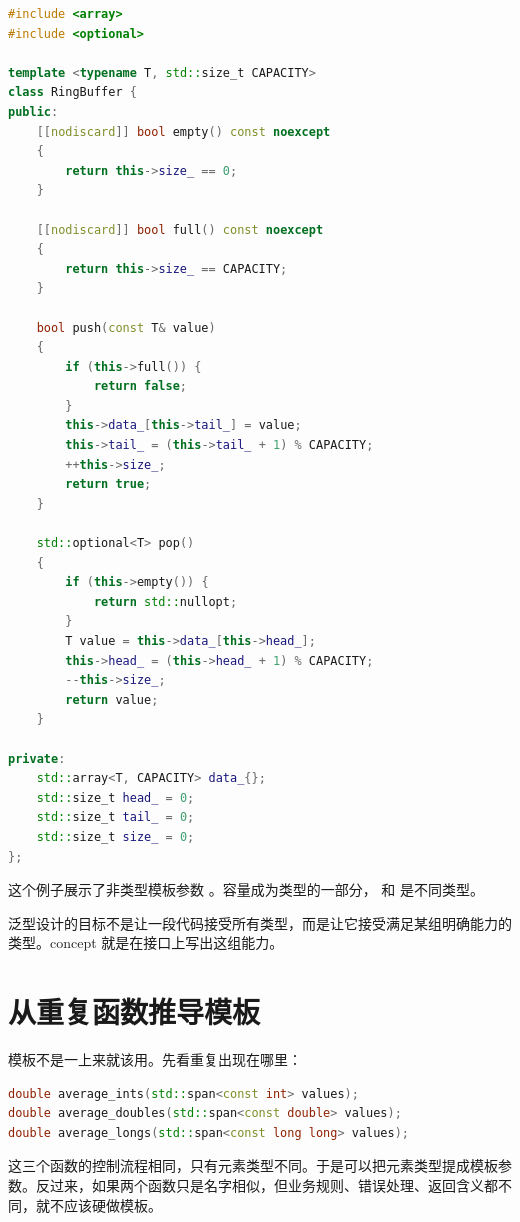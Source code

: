 \begin{lstlisting}[language=C++,caption={简单固定容量缓冲区}]
#include <array>
#include <optional>

template <typename T, std::size_t CAPACITY>
class RingBuffer {
public:
    [[nodiscard]] bool empty() const noexcept
    {
        return this->size_ == 0;
    }

    [[nodiscard]] bool full() const noexcept
    {
        return this->size_ == CAPACITY;
    }

    bool push(const T& value)
    {
        if (this->full()) {
            return false;
        }
        this->data_[this->tail_] = value;
        this->tail_ = (this->tail_ + 1) % CAPACITY;
        ++this->size_;
        return true;
    }

    std::optional<T> pop()
    {
        if (this->empty()) {
            return std::nullopt;
        }
        T value = this->data_[this->head_];
        this->head_ = (this->head_ + 1) % CAPACITY;
        --this->size_;
        return value;
    }

private:
    std::array<T, CAPACITY> data_{};
    std::size_t head_ = 0;
    std::size_t tail_ = 0;
    std::size_t size_ = 0;
};
\end{lstlisting}

这个例子展示了非类型模板参数 。容量成为类型的一部分， 和  是不同类型。

\begin{keyidea}
泛型设计的目标不是让一段代码接受所有类型，而是让它接受满足某组明确能力的类型。concept 就是在接口上写出这组能力。
\end{keyidea}

\section{从重复函数推导模板}

模板不是一上来就该用。先看重复出现在哪里：

\begin{lstlisting}[language=C++,caption={重复的平均值函数}]
double average_ints(std::span<const int> values);
double average_doubles(std::span<const double> values);
double average_longs(std::span<const long long> values);
\end{lstlisting}

这三个函数的控制流程相同，只有元素类型不同。于是可以把元素类型提成模板参数。反过来，如果两个函数只是名字相似，但业务规则、错误处理、返回含义都不同，就不应该硬做模板。

